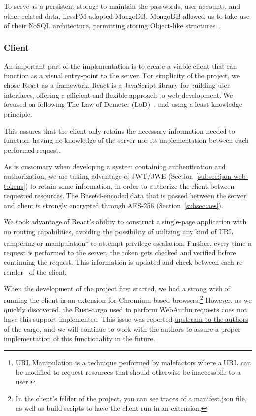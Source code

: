 To serve as a persistent storage to maintain the passwords, user accounts,
and other related data, LessPM adopted MongoDB\@.
MongoDB allowed us to take use of their NoSQL architecture, permitting
storing Object-like structures~\cite{mongodb2021nosql}.

\subsubsection{Client}
An important part of the implementation is to create a viable client that can
function as a visual entry-point to the server.
For simplicity of the project, we chose React as a framework.
React is a JavaScript library for building user interfaces, offering a
efficient and flexible approach to web development.
We focused on following The Law of Demeter (LoD)~\cite{lieberherr1990assuring},
and using a least-knowledge principle.

This assures that the client only retains the necessary information needed to
function, having no knowledge of the server nor its implementation between each
performed request.

As is customary when developing a system containing authentication and
authorization, we are taking advantage of JWT/JWE
(Section~\ref{subsec:json-web-tokens})
to retain some information, in order to authorize the client between
requested resources.
The Base64-encoded data that is passed between the server and client is
strongly encrypted through AES-256 (Section~\ref{subsec:aes}).

We took advantage of React's ability to construct a single-page application with
no routing capabilities, avoiding the possibility of utilizing any kind of URL
tampering or manipulation\footnote{
  URL Manipulation is a technique performed by malefactors where a URL can be
  modified to request resources that should otherwise be inaccessbile to a user.
} to attempt privilege escalation.
Further, every time a request is performed to the server, the token gets
checked and verified before continuing the request.
This information is updated and check between each
re-render~\cite{react-component} of the client.

When the development of the project first started, we had a strong wish of
running the client in an extension for Chromium-based browsers.\footnote{
  In the client's folder of the project, you can see traces of a
  manifest.json file, as well as build scripts to have the client run in an
  extension.
}
However, as we quickly discovered, the Rust-cargo used to perform WebAuthn
requests does not have this support implemented.
This issue was reported
\href{https://github.com/kanidm/webauthn-rs/issues/288}{upstream to the authors}
of the cargo, and we will continue to work with the authors to assure a proper
implementation of this functionality in the future.

